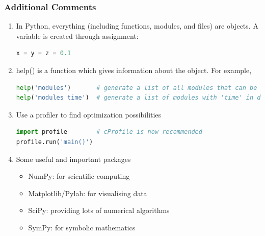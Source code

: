 
\begin{frame}[fragile]
	\MyLogo
	\frametitle{Additional Comments}  
	\small
	
\begin{enumerate}

\item In Python, everything (including functions, modules, and files) are objects. A variable is created through assignment:
\begin{lstlisting}[language=python,numbers=none] 
x = y = z = 0.1
\end{lstlisting}
				
\item help() is a function which gives information about the object. For example, 
\begin{lstlisting}[language=python,numbers=none] 
help('modules')       # generate a list of all modules that can be imported
help('modules time')  # generate a list of modules with 'time' in description
\end{lstlisting}
		
\item Use a profiler to find optimization possibilities
\begin{lstlisting}[language=python,numbers=none] 
import profile        # cProfile is now recommended
profile.run('main()')
\end{lstlisting}

\item Some useful and important packages
	\begin{itemize}
	\item NumPy: for scientific computing
	\item Matplotlib/Pylab: for visualising data
	\item SciPy: providing lots of numerical algorithms
	\item SymPy: for symbolic mathematics
	\end{itemize}
		
\end{enumerate}


\end{frame}